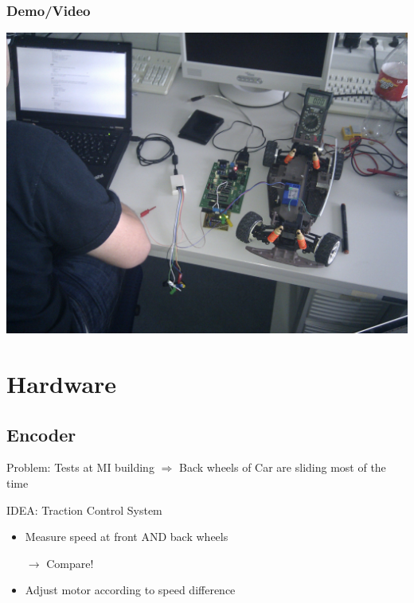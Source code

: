 \documentclass[pdf]{beamer}
\begin{document}
\begin{frame}
\frametitle{Demo/Video}
  \begin{center}
  \includegraphics[width = \textwidth]{pics/raw/servoboard_test2.jpg}
  \end{center}
\end{frame}

\section{Hardware}
\subsection{Encoder}
\begin{frame}
Problem: Tests at MI building $\Rightarrow$ Back wheels of Car are sliding most of the time
\begin{exampleblock}{IDEA: Traction Control System}
\begin{itemize}
  \item Measure speed at front AND back wheels
  \item[$\rightarrow$] Compare!
  \item Adjust motor according to speed difference
\end{itemize}
\end{exampleblock}
\end{frame}
\end{document}
